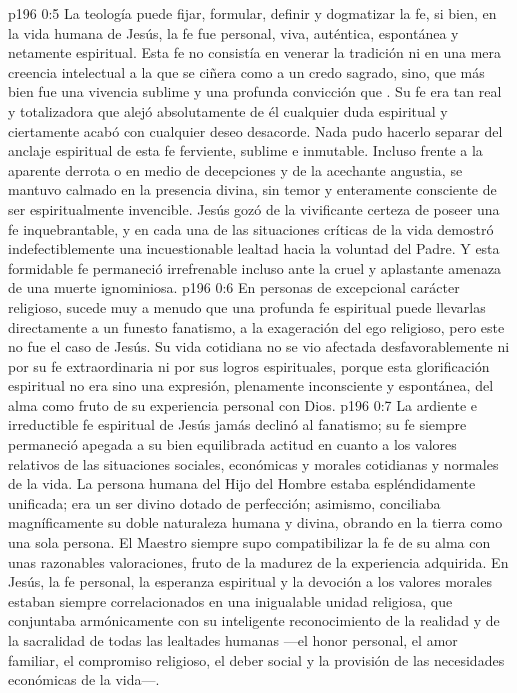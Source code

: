 \vs p196 0:5 La teología puede fijar, formular, definir y dogmatizar la fe, si bien, en la vida humana de Jesús, la fe fue personal, viva, auténtica, espontánea y netamente espiritual. Esta fe no consistía en venerar la tradición ni en una mera creencia intelectual a la que se ciñera como a un credo sagrado, sino, que más bien fue una vivencia sublime y una profunda convicción que . Su fe era tan real y totalizadora que alejó absolutamente de él cualquier duda espiritual y ciertamente acabó con cualquier deseo desacorde. Nada pudo hacerlo separar del anclaje espiritual de esta fe ferviente, sublime e inmutable. Incluso frente a la aparente derrota o en medio de decepciones y de la acechante angustia, se mantuvo calmado en la presencia divina, sin temor y enteramente consciente de ser espiritualmente invencible. Jesús gozó de la vivificante certeza de poseer una fe inquebrantable, y en cada una de las situaciones críticas de la vida demostró indefectiblemente una incuestionable lealtad hacia la voluntad del Padre. Y esta formidable fe permaneció irrefrenable incluso ante la cruel y aplastante amenaza de una muerte ignominiosa.
\vs p196 0:6 En personas de excepcional carácter religioso, sucede muy a menudo que una profunda fe espiritual puede llevarlas directamente a un funesto fanatismo, a la exageración del ego religioso, pero este no fue el caso de Jesús. Su vida cotidiana no se vio afectada desfavorablemente ni por su fe extraordinaria ni por sus logros espirituales, porque esta glorificación espiritual no era sino una expresión, plenamente inconsciente y espontánea, del alma como fruto de su experiencia personal con Dios.
\vs p196 0:7 La ardiente e irreductible fe espiritual de Jesús jamás declinó al fanatismo; su fe siempre permaneció apegada a su bien equilibrada actitud en cuanto a los valores relativos de las situaciones sociales, económicas y morales cotidianas y normales de la vida. La persona humana del Hijo del Hombre estaba espléndidamente unificada; era un ser divino dotado de perfección; asimismo, conciliaba magníficamente su doble naturaleza humana y divina, obrando en la tierra como una sola persona. El Maestro siempre supo compatibilizar la fe de su alma con unas razonables valoraciones, fruto de la madurez de la experiencia adquirida. En Jesús, la fe personal, la esperanza espiritual y la devoción a los valores morales estaban siempre correlacionados en una inigualable unidad religiosa, que conjuntaba armónicamente con su inteligente reconocimiento de la realidad y de la sacralidad de todas las lealtades humanas ---el honor personal, el amor familiar, el compromiso religioso, el deber social y la provisión de las necesidades económicas de la vida---.
